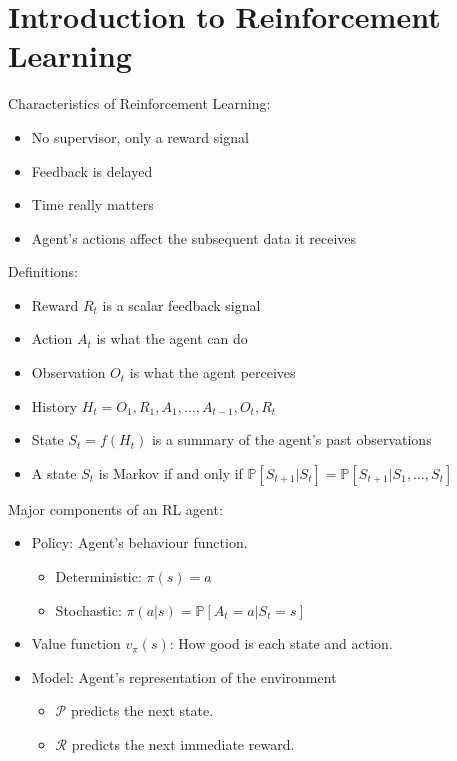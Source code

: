 \section{Introduction to Reinforcement Learning}

Characteristics of Reinforcement Learning:
\begin{itemize}
    \item No supervisor, only a reward signal
    \item Feedback is delayed
    \item Time really matters
    \item Agent's actions affect the subsequent data it receives
\end{itemize}

\noindent Definitions:

\begin{itemize}
    \item Reward $R_t$ is a scalar feedback signal
    \item Action $A_t$ is what the agent can do
    \item Observation $O_t$ is what the agent perceives
    \item History $H_t = O_1, R_1, A_1, \ldots, A_{t-1}, O_t, R_t$
    \item State $S_t = f(H_t)$ is a summary of the agent's past observations
    \item A state $S_t$ is Markov if and only if $\mathbb{P}[S_{t+1}|S_t] =
              \mathbb{P}[S_{t+1}|S_1, \ldots, S_t]$
\end{itemize}

\noindent Major components of an RL agent:

\begin{itemize}
    \item Policy: Agent's behaviour function.
          \begin{itemize}
              \item Deterministic: $\pi(s) = a$
              \item Stochastic: $\pi(a|s) = \mathbb{P}[A_t = a | S_t = s]$
          \end{itemize}
    \item Value function $v_{\pi}(s)$: How good is each state and action.
    \item Model: Agent's representation of the environment
          \begin{itemize}
              \item $\mathcal{P}$ predicts the next state.
              \item $\mathcal{R}$ predicts the next immediate reward.
          \end{itemize}
\end{itemize}
